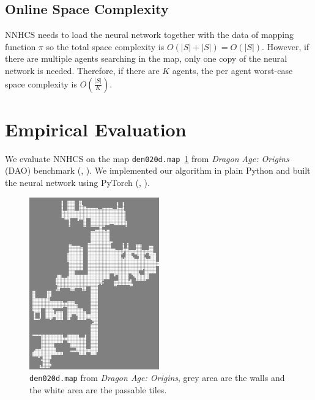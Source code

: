 \documentclass[letterpaper]{article}
\newcommand{\citea}[1]{(\citeauthor{#1}, \citeyear{#1})}
\numberwithin{equation}{section}
\numberwithin{theorem}{section}
\numberwithin{lemma}{section}
\numberwithin{df}{section}
\begin{document}
    \subsection{Online Space Complexity}\label{subsec:online-space-complexity}
    NNHCS needs to load the neural network together with the data of mapping function $\pi$ so the total space complexity is $O(|S| + |S|) = O(|S|)$.
    However, if there are multiple agents searching in the map, only one copy of the neural network is needed.
    Therefore, if there are $K$ agents, the per agent worst-case space complexity is $O(\frac{|S|}{K})$.

    \section{Empirical Evaluation}\label{sec:empirical-evaluation}

    We evaluate NNHCS on the map \texttt{den020d.map}~\ref{fig:map} from \textit{Dragon Age: Origins} (DAO) benchmark \citea{benchmarks}.
    We implemented our algorithm in plain Python and built the neural network using PyTorch \citea{pytorch}.

    \begin{figure}[h]
        \includegraphics[width=0.5\textwidth]{world.png}
        \caption {\small \texttt{den020d.map} from \textit{Dragon Age: Origins}, grey area are the walls and the white area are the passable tiles.}
        \centering
        \label{fig:map}
    \end{figure}
\end{document}
